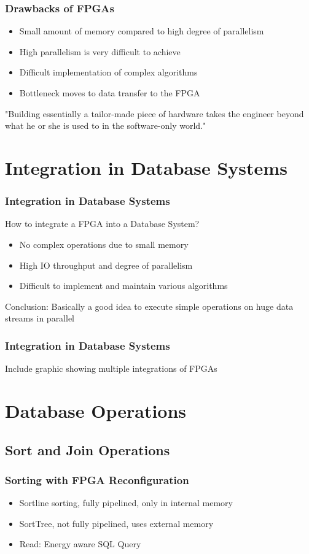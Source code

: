 \documentclass{beamer}
\begin{document}
\begin{frame}
\frametitle{Drawbacks of FPGAs}
\begin{itemize}
	\item Small amount of memory compared to high degree of parallelism
	\item High parallelism is very difficult to achieve
	\item Difficult implementation of complex algorithms
	\item Bottleneck moves to data transfer to the FPGA 
\end{itemize}
\begin{center}
	"Building essentially a tailor-made piece of hardware takes the engineer beyond what he or she is used to in the software-only world."
\end{center}

\end{frame}

\section{Integration in Database Systems}
\begin{frame}
	\frametitle{Integration in Database Systems}
	How to integrate a FPGA into a Database System?
	\begin{itemize}
		\item No complex operations due to small memory
		\item High IO throughput and degree of parallelism
		\item Difficult to implement and maintain various algorithms
	\end{itemize}
	Conclusion: Basically a good idea to execute simple operations on huge data streams in parallel
\end{frame}

\begin{frame}
\frametitle{Integration in Database Systems}
Include graphic showing multiple integrations of FPGAs
\end{frame}

\section{Database Operations}

\subsection{Sort and Join Operations}
\begin{frame}
	\frametitle{Sorting with FPGA Reconfiguration}
	\begin{itemize}
		\item Sortline sorting, fully pipelined, only in internal memory
		\item SortTree, not fully pipelined, uses external memory
		\item Read: Energy aware SQL Query
	\end{itemize}
\end{frame}
\end{document}
